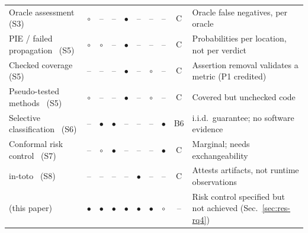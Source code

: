\begin{table}[!t]
\begin{tabular}{|L{3.25cm}|c|c|c|c|c|c|c|c|L{3.35cm}|}
Oracle assessment~\cite{jahangirova2016oracle} (S3) & $\circ$ & -- & -- & $\bullet$ & -- & -- & -- & C & Oracle false negatives, per oracle \\
PIE / failed propagation~\cite{voas1992pie,androutsopoulos2014analysis} (S5) & $\circ$ & $\circ$ & -- & $\bullet$ & -- & -- & -- & C & Probabilities per location, not per verdict \\
Checked coverage~\cite{schuler2011assessing} (S5) & -- & -- & -- & $\bullet$ & -- & $\circ$ & -- & C & Assertion removal validates a metric (P1 credited) \\
Pseudo-tested methods~\cite{niedermayr2016will,veraperez2019comprehensive} (S5) & $\circ$ & -- & -- & $\bullet$ & -- & $\circ$ & -- & C & Covered but unchecked code \\
Selective classification~\cite{geifman2017selective} (S6) & -- & $\bullet$ & $\bullet$ & -- & -- & -- & $\bullet$ & B6 & i.i.d.\ guarantee; no software evidence \\
Conformal risk control~\cite{angelopoulos2024conformal} (S7) & -- & $\circ$ & $\bullet$ & -- & -- & -- & $\bullet$ & C & Marginal; needs exchangeability \\
in-toto~\cite{torresarias2019intoto} (S8) & -- & -- & -- & -- & $\bullet$ & -- & -- & C & Attests artifacts, not runtime observations \\
\hline
\sbg{} (this paper) & $\bullet$ & $\bullet$ & $\bullet$ & $\bullet$ & $\bullet$ & $\bullet$ & $\circ$ & -- & Risk control specified but not achieved (Sec.~\ref{sec:res-rq4}) \\
\hline
\end{tabular}
\end{table}

